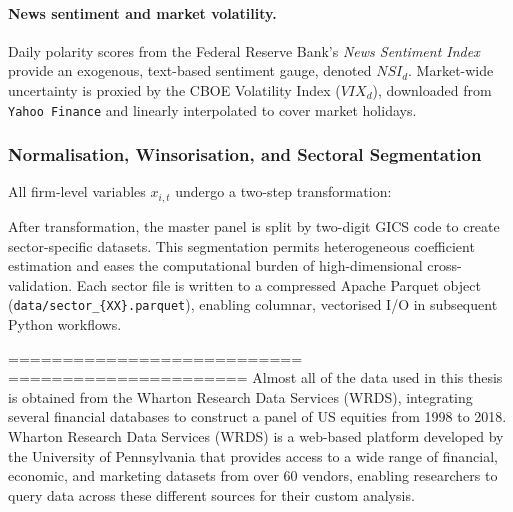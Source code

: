 \paragraph{News sentiment and market volatility.}  Daily polarity scores from the Federal Reserve Bank's \emph{News Sentiment Index} provide an exogenous, text-based sentiment gauge, denoted \(NSI_{d}\).  Market-wide uncertainty is proxied by the CBOE Volatility Index (\(VIX_{d}\)), downloaded from \texttt{Yahoo Finance} and linearly interpolated to cover market holidays.

\subsubsection{Normalisation, Winsorisation, and Sectoral Segmentation}\label{sec:normalise}

All firm-level variables \(x_{i,t}\) undergo a two-step transformation:


After transformation, the master panel is split by two-digit GICS code to create sector-specific datasets.  This segmentation permits heterogeneous coefficient estimation and eases the computational burden of high-dimensional cross-validation.  Each sector file is written to a compressed Apache Parquet object (\texttt{data/sector\_\{XX\}.parquet}), enabling columnar, vectorised I/O in subsequent Python workflows.





===========================
======================
Almost all of the data used in this thesis is obtained from the Wharton Research Data Services (WRDS), integrating several financial databases to construct a panel of US equities from 1998 to 2018. Wharton Research Data Services (WRDS) is a web-based platform developed by the University of Pennsylvania that provides access to a wide range of financial, economic, and marketing datasets from over 60 vendors, enabling researchers to query data across these different sources for their custom analysis. 

